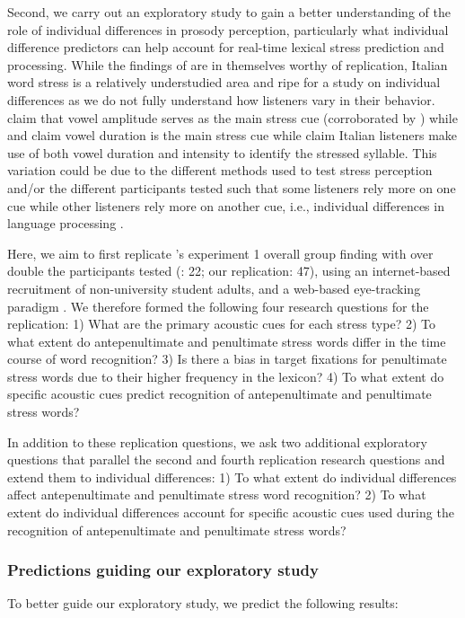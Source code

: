 Second, we carry out an exploratory study to gain a better understanding of the role of individual differences in prosody perception, particularly what individual difference predictors can help account for real-time lexical stress prediction and processing. While the findings of \cite{Sulpizio_McQueen_2012} are in themselves worthy of replication, Italian word stress is a relatively understudied area and ripe for a study on individual differences as we do not fully understand how listeners vary in their behavior. \cite{Maturi1998} claim that vowel amplitude serves as the main stress cue (corroborated by \cite{Sulpizio_McQueen_2012}) while \cite{Alfano2006} and \cite{Alfano2009} claim vowel duration is the main stress cue while \cite{Tagliapietra2005} claim Italian listeners make use of both vowel duration and intensity to identify the stressed syllable. This variation could be due to the different methods used to test stress perception and/or the different participants tested such that some listeners rely more on one cue while other listeners rely more on another cue, i.e., individual differences in language processing \citep{Yu2019, Kidd2018}.

Here, we aim to first replicate \cite{Sulpizio_McQueen_2012}'s experiment 1 overall group finding with over double the participants tested (\cite{Sulpizio_McQueen_2012}: 22; our replication: 47), using an internet-based recruitment of non-university student adults, and a web-based eye-tracking paradigm \citep{Vos_2017}. We therefore formed the following four research questions for the replication: 1) What are the primary acoustic cues for each stress type? 2) To what extent do antepenultimate and penultimate stress words differ in the time course of word recognition? 3) Is there a bias in target fixations for penultimate stress words due to their higher frequency in the lexicon? 4) To what extent do specific acoustic cues predict recognition of antepenultimate and penultimate stress words? 

In addition to these replication questions, we ask two additional exploratory questions that parallel the second and fourth replication research questions and extend them to individual differences: 1) To what extent do individual differences affect antepenultimate and penultimate stress word recognition? 2) To what extent do individual differences account for specific acoustic cues used during the recognition of antepenultimate and penultimate stress words?

\subsubsection{Predictions guiding our exploratory study}
To better guide our exploratory study, we predict the following results: 

